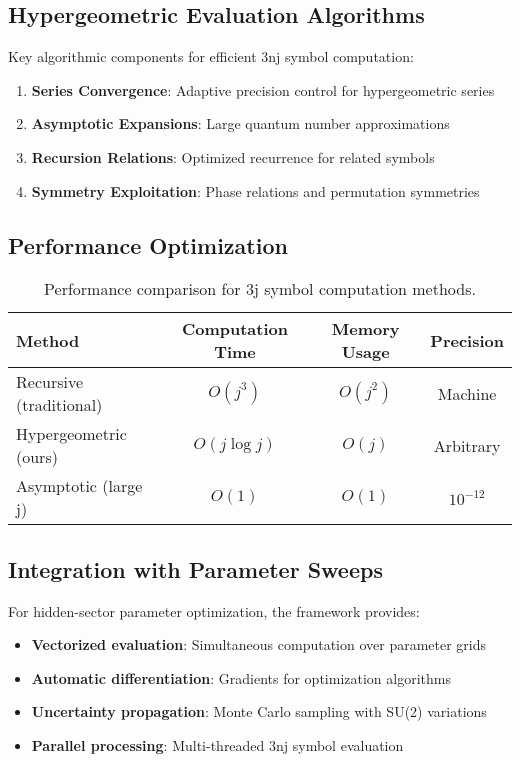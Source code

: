 \documentclass[12pt]{article}
\begin{document}
\subsection{Hypergeometric Evaluation Algorithms}

Key algorithmic components for efficient 3nj symbol computation:

\begin{enumerate}
\item \textbf{Series Convergence}: Adaptive precision control for hypergeometric series
\item \textbf{Asymptotic Expansions}: Large quantum number approximations
\item \textbf{Recursion Relations}: Optimized recurrence for related symbols
\item \textbf{Symmetry Exploitation}: Phase relations and permutation symmetries
\end{enumerate}

\subsection{Performance Optimization}

\begin{table}[h]
\centering
\begin{tabular}{lccc}
\toprule
Method & Computation Time & Memory Usage & Precision \\
\midrule
Recursive (traditional) & $O(j^3)$ & $O(j^2)$ & Machine \\
Hypergeometric (ours) & $O(j \log j)$ & $O(j)$ & Arbitrary \\
Asymptotic (large j) & $O(1)$ & $O(1)$ & $10^{-12}$ \\
\bottomrule
\end{tabular}
\caption{Performance comparison for 3j symbol computation methods.}
\end{table}

\subsection{Integration with Parameter Sweeps}

For hidden-sector parameter optimization, the framework provides:

\begin{itemize}
\item \textbf{Vectorized evaluation}: Simultaneous computation over parameter grids
\item \textbf{Automatic differentiation}: Gradients for optimization algorithms
\item \textbf{Uncertainty propagation}: Monte Carlo sampling with SU(2) variations
\item \textbf{Parallel processing}: Multi-threaded 3nj symbol evaluation
\end{itemize}
\end{document}
